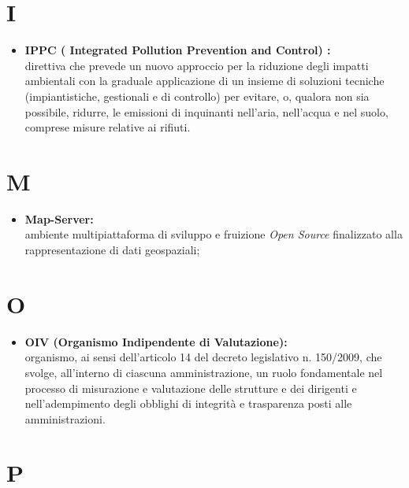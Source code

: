 \documentclass[11pt]{book}              %
\begin{document}
\section*{I}
\begin{itemize}

	\item \textbf{{\color{OliveGreen}IPPC} ( Integrated Pollution Prevention and Control) :} \\
	 direttiva che prevede un nuovo approccio per la riduzione degli impatti ambientali con la graduale applicazione di un insieme di soluzioni tecniche (impiantistiche, gestionali e di controllo) per evitare, o, qualora non sia possibile, ridurre, le emissioni di inquinanti nell'aria, nell'acqua e nel suolo, comprese misure relative ai rifiuti.

\end{itemize}

\section*{M}
\begin{itemize}
	\item \textbf{{\color{Plum} Map-Server}:} \\
	ambiente multipiattaforma di sviluppo e fruizione \textit{Open Source} finalizzato alla rappresentazione di dati geospaziali;
\end{itemize}

\section*{O}

\begin{itemize}

	\item \textbf{{\color{OliveGreen}OIV} (Organismo Indipendente di Valutazione):} \\	organismo, ai sensi dell'articolo 14 del decreto legislativo n. 150/2009, che svolge, all'interno di ciascuna amministrazione, un ruolo fondamentale nel processo di misurazione e valutazione delle strutture e dei dirigenti e nell'adempimento degli obblighi di integrità e trasparenza posti alle amministrazioni.
	
\end{itemize}

\section*{P}
\end{document}

